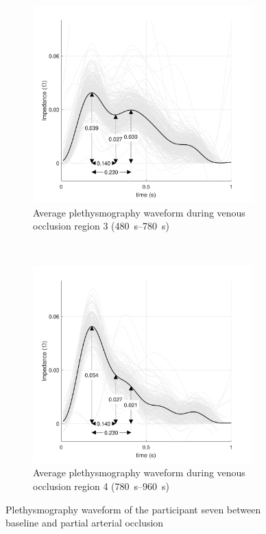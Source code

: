 \begin{figure}[t!]
	\centering
	\begin{subfigure}[t]{0.5\textwidth}
		\centering
		\includegraphics[height=7.6cm]{figure8a}
		\caption{Average plethysmography waveform during venous occlusion region 3 (\SIrange{480}{780}{\second})}
		\label{fig:iPG_arterial_baseline}
	\end{subfigure}%
	~ 
	\begin{subfigure}[t]{0.5\textwidth}
		\centering
		\includegraphics[height=7.6cm]{figure8b}
		\caption{Average plethysmography waveform during venous occlusion region 4 (\SIrange{780}{960}{\second})}
		\label{fig:iPG_arterial_occlusion}
	\end{subfigure}
	\caption{Plethysmography waveform of the participant seven between baseline and partial arterial occlusion}
	\label{fig:iPG_arterial}
\end{figure}

